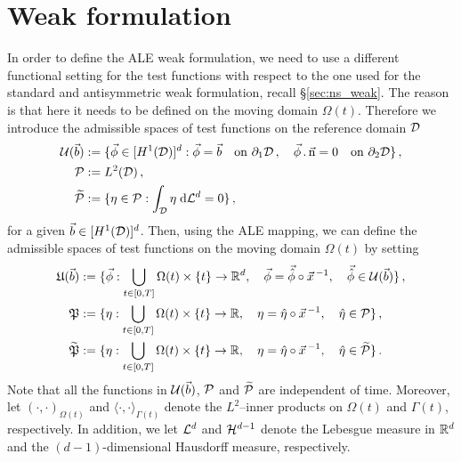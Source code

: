 \section{Weak formulation}\label{sec:ale_weak}
In order to define the ALE weak formulation, we need to use a different
functional setting for the test functions with respect to the one used for the
standard and antisymmetric weak formulation, recall \S\ref{sec:ns_weak}.
The reason is that here it
needs to be defined on the moving domain $\Omega(t)$. Therefore we introduce
the admissible spaces of test functions on the reference domain $\mathcal D$
\begin{align*}
\mathcal{U}(\vec{b}) &:= \{\vec \phi\in[H^1(\mathcal D)]^d:
\vec \phi =\vec b\quad \mbox{on }\partial_1\mathcal D\,,
\quad \vec \phi\,.\,\vec{\rm n}=0 \quad \mbox{on }\partial_2\mathcal D\}\,,\\
\mathcal{P} &:= L^2(\mathcal D)\,,\\
\widetilde{\mathcal{P}} &:= \{\eta\in\mathcal{P} : \int_\mathcal D\eta\;{\rm d}{\cal L}^{d}=0 \}\,,
\end{align*}
for a given $\vec b \in [H^1(\mathcal D)]^d$. Then, using the ALE mapping, we can
define the admissible spaces of test functions on the moving domain $\Omega(t)$
by setting
\begin{align*}
\mathfrak{U}(\vec{b}) &:= \{ \vec\phi:
\bigcup_{t \in [0,T]} \Omega(t)\times \{t\} \to \mathbb R^d,\quad
\vec \phi=\vec{\hat\phi}\circ\vec x^{\,-1},\quad\vec{\hat\phi}
\in\mathcal{U}(\vec{b})\}\,,\\
\mathfrak{P} &:= \{ \eta:
\bigcup_{t \in [0,T]} \Omega(t)\times \{t\} \to \mathbb R,\quad
\eta=\hat\eta\circ\vec x^{\,-1},\quad\hat\eta\in\mathcal{P} \}\,,\\
\widetilde{\mathfrak{P}} &:= \{ \eta:
\bigcup_{t \in [0,T]} \Omega(t)\times \{t\} \to \mathbb R,\quad
\eta=\hat\eta\circ\vec x^{\,-1},\quad\hat\eta\in\widetilde{\mathcal{P}} \}\,.
\end{align*}
Note that all the functions in $\mathcal{U}(\vec{b})$, $\mathcal{P}$ and
$\widetilde{\mathcal{P}}$ are independent of time. Moreover, let
$(\cdot,\cdot)_{\Omega(t)}$ and $\langle \cdot, \cdot
\rangle_{\Gamma(t)}$ denote the $L^2$--inner products on $\Omega(t)$ and
$\Gamma(t)$, respectively. In addition, we let $\mathcal{L}^d$ and $\mathcal{H}^{d-1}$ denote the
Lebesgue measure in $\mathbb R^d$ and the $(d-1)$-dimensional Hausdorff measure,
respectively.


